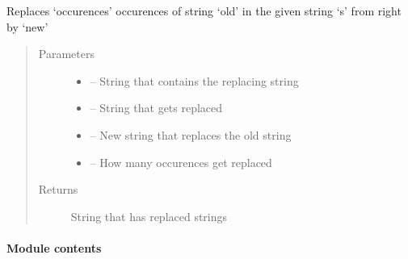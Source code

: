 \documentclass[letterpaper,10pt,english]{sphinxmanual}
\begin{document}
\begin{fulllineitems}
\label{_source/son_editor.util:son_editor.util.requestutil.rreplace}
Replaces `occurences' occurences of string `old' in the given string `s' from right by `new'
\begin{quote}\begin{description}
\item[{Parameters}] \leavevmode\begin{itemize}
\item {} 
 -- String that contains the replacing string

\item {} 
 -- String that gets replaced

\item {} 
 -- New string that replaces the old string

\item {} 
 -- How many occurences get replaced

\end{itemize}

\item[{Returns}] \leavevmode
String that has replaced strings

\end{description}\end{quote}

\end{fulllineitems}


\begin{fulllineitems}
\label{_source/son_editor.util:son_editor.util.requestutil.update_config}
\end{fulllineitems}



\paragraph{Module contents}
\label{_source/son_editor.util:module-son_editor.util}\label{_source/son_editor.util:module-contents}
\end{document}
